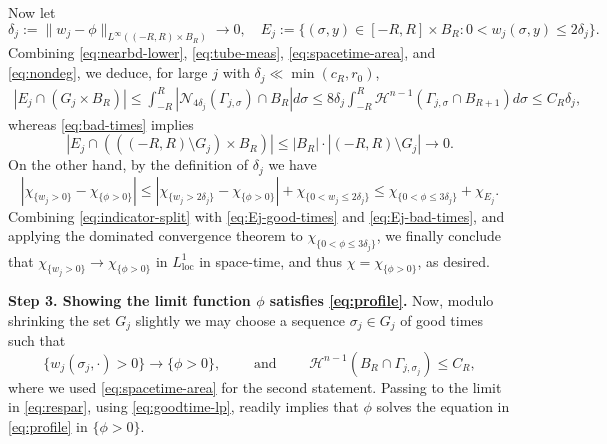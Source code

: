 \documentclass[11pt]{article}
\numberwithin{equation}{section}
\theoremstyle{definition}
\begin{document}
Now let
\begin{equation*}
    \delta_j:=\|w_j-\phi\|_{L^{\infty}((-R,R)\times B_R)} \to 0, \quad E_j:=\{(\sigma,y)\in [-R,R]\times B_R: 0<w_j(\sigma,y)\leq 2\delta_j\}.
\end{equation*}
Combining \eqref{eq:nearbd-lower}, \eqref{eq:tube-meas}, \eqref{eq:spacetime-area}, and \eqref{eq:nondeg}, we deduce, for large $j$ with $\delta_j \ll \min(c_R,r_0)$,
	\begin{multline}\label{eq:Ej-good-times}
	    |E_j\cap (G_j\times B_R)|\leq \int_{-R}^{R}|\mathcal{N}_{4\delta_j}(\Gamma_{j,\sigma})\cap B_{R}|d\sigma 
	\leq 8\delta_j \int_{-R}^R \mathcal{H}^{n-1}(\Gamma_{j,\sigma}\cap B_{R+1})d\sigma \leq C_R \delta_j,
	\end{multline}
	whereas \eqref{eq:bad-times} implies 
	\begin{equation}\label{eq:Ej-bad-times}
	    |E_j \cap (((-R,R)\setminus G_j)\times B_R)|\leq |B_R|\cdot |(-R,R)\setminus G_j|\to 0.
	\end{equation}
On the other hand, by the definition of $\delta_j$ we have
\begin{equation}\label{eq:indicator-split}
|\chi_{\{w_j>0\}}-\chi_{\{\phi>0\}}|\leq |\chi_{\{w_j>2\delta_j\}}-\chi_{\{\phi>0\}}|+ \chi_{\{0<w_j\leq 2\delta_j\}}\leq \chi_{\{0<\phi \leq 3\delta_j\}}+\chi_{E_j}.    
\end{equation}
	Combining \eqref{eq:indicator-split} with \eqref{eq:Ej-good-times} and \eqref{eq:Ej-bad-times}, and applying the dominated convergence theorem to $\chi_{\{0<\phi\leq 3\delta_j\}}$, we finally conclude that $\chi_{\{w_j>0\}} \to \chi_{\{\phi>0\}}$ in $L_{\operatorname{loc}}^1$ in space-time, and thus $\chi=\chi_{\{\phi>0\}}$, as desired.

{\bf Step 3. Showing the limit function $\phi$ satisfies \eqref{eq:profile}.}
Now, modulo shrinking the set $G_j$ slightly we may choose a sequence $\sigma_j\in G_j$ of good times such that
\begin{equation}\label{eq:periUB}
    \{w_j(\sigma_j, \cdot)>0\} \to \{\phi>0\}, \qquad \text{ and } \qquad \mathcal{H}^{n-1}(B_R \cap \Gamma_{j,\sigma_j})\leq C_R,
\end{equation}
where we used \eqref{eq:spacetime-area} for the second statement.
Passing to the limit in \eqref{eq:respar}, using \eqref{eq:goodtime-lp}, readily implies that $\phi$ solves the equation in \eqref{eq:profile} in $\{\phi>0\}$. 
\end{document}
